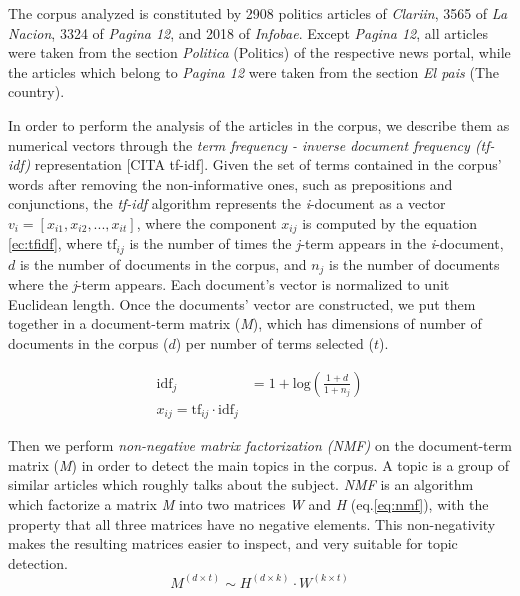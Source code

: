 \documentclass[a4paper, 12pt]{article}
\begin{document}
\par The corpus analyzed is constituted by 2908 politics articles of \emph{Clariin}, 3565 of \emph{La Nacion}, 3324 of \emph{Pagina 12}, and 2018 of \emph{Infobae}. Except \emph{Pagina 12}, all articles were taken from the section \emph{Politica}  (Politics) of the respective news portal, while the articles which belong to \emph{Pagina 12} were taken from the section \emph{El pais} (The country).

In order to perform the analysis of the articles in the corpus, we describe them as numerical vectors through the \textit{term frequency - inverse document frequency (tf-idf)} representation [CITA tf-idf]. Given the set of terms contained in the corpus' words after removing the non-informative ones, such as prepositions and conjunctions, the \textit{tf-idf} algorithm represents the \textit{i}-document as a vector $v_i = [x_{i1}, x_{i2}, ... , x_{it}]$, where the component $x_{ij}$ is computed by the equation \ref{ec:tfidf}, where $\textrm{tf}_{ij}$ is the number of times the \textit{j}-term appears in the \textit{i}-document, $d$ is the number of documents in the corpus, and $n_j$ is the number of documents where the \textit{j}-term appears. Each document's vector is normalized to unit Euclidean length. Once the documents' vector are constructed, we put them together in a document-term matrix (\emph{M}), which has dimensions of number of documents in the corpus ($d$) per number of terms selected ($t$).

\begin{center}
\begin{equation}
\begin{split}
\text{idf}_{j} & = 1 + \textrm{log}(\frac{1 + d}{1 + n_j}) \\
x_{ij} = \textrm{tf}_{ij} \cdot \textrm{idf}_{j}
\end{split}
\label{ec:tfidf}
\end{equation}
\end{center}

Then we perform \emph{non-negative matrix factorization (NMF)} on the document-term matrix (\emph{M}) in order to detect the main topics in the corpus. A topic is a group of similar articles which roughly talks about the subject. 
\emph{NMF} is an algorithm which factorize a matrix \emph{M} into two matrices \emph{W} and \emph{H} (eq.\ref{eq:nmf}), with the property that all three matrices have no negative elements. This non-negativity makes the resulting matrices easier to inspect, and very suitable for topic detection.
\begin{equation}
M^{(d \times t)} \sim H^{(d \times k)} \cdot W^{(k \times t)}
\label{eq:nmf}
\end{equation}
\end{document}
